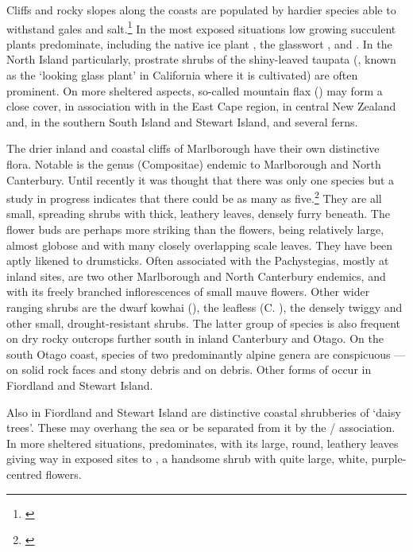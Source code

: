 Cliffs and rocky slopes along the coasts are populated by hardier species able to withstand gales and salt.\footnote{\cite{moore1963plants}}
In the most exposed situations low growing succulent plants predominate, including the native ice plant , the glasswort ,  and .
In the North Island particularly, prostrate shrubs of the shiny-leaved taupata (, known as the `looking glass plant' in California where it is cultivated) are often prominent.
On more sheltered aspects, so-called mountain flax () may form a close cover, in association with  in the East Cape region,  in central New Zealand and, in the southern South Island and Stewart Island,  and several ferns.

The drier inland and coastal cliffs of Marlborough have their own distinctive flora.
Notable is the genus  (Compositae) endemic to Marlborough and North Canterbury.
Until recently it was thought that there was only one species but a study in progress indicates that there could be as many as five.\footnote{\cite{molloy1980taxonomy}}
They are all small, spreading shrubs with thick, leathery leaves, densely furry beneath.
The flower buds are perhaps more striking than the flowers, being relatively large, almost globose and with many closely overlapping scale leaves.
They have been aptly likened to drumsticks.
Often associated with the Pachystegias, mostly at inland sites, are two other Marlborough and North Canterbury endemics,  and  with its freely branched inflorescences of small mauve flowers.
Other wider ranging shrubs are the dwarf kowhai (), the leafless  (C. ), the densely twiggy  and other small, drought-resistant shrubs.
The latter group of species is also frequent on dry rocky outcrops further south in inland Canterbury and Otago.
On the south Otago coast, species of two predominantly alpine genera are conspicuous ---  on solid rock faces and stony debris and  on debris.
Other forms of  occur in Fiordland and Stewart Island.

Also in Fiordland and Stewart Island are distinctive coastal shrubberies of `daisy trees'.
These may overhang the sea or be separated from it by the  /  association.
In more sheltered situations,  predominates, with its large, round, leathery leaves giving way in exposed sites to , a handsome shrub with quite large, white, purple-centred flowers.

